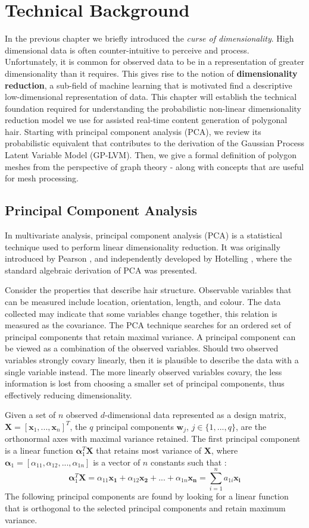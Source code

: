 \documentclass[ %
author={Dillon Keith Diep},
supervisor={Dr. Carl Henrik Ek},
degree={MEng},
title={ART-CG Hair:},
subtitle={Assisted Real-time Content Generation of Stylised Virtual Hair},
type={Research},
year={2017} ]{dissertation}
\begin{document}
\chapter{Technical Background}
\label{chap:technical}
In the previous chapter we briefly introduced the \textit{curse of dimensionality}. High dimensional data is often counter-intuitive to perceive and process. Unfortunately, it is common for observed data to be in a representation of greater dimensionality than it requires. This gives rise to the notion of \textbf{dimensionality reduction}, a sub-field of machine learning that is motivated find a descriptive low-dimensional representation of data.
This chapter will establish the technical foundation required for understanding the probabilistic non-linear dimensionality reduction model we use for assisted real-time content generation of polygonal hair. Starting with principal component analysis (PCA), we review its probabilistic equivalent that contributes to the derivation of the Gaussian Process Latent Variable Model (GP-LVM). Then, we give a formal definition of polygon meshes from the perspective of graph theory - along with concepts that are useful for mesh processing.

\section{Principal Component Analysis}
In multivariate analysis, principal component analysis (PCA) is a statistical technique used to perform linear dimensionality reduction. It was originally introduced by Pearson \cite{pca1901}, and independently developed by Hotelling \cite{pca1933}, where the standard algebraic derivation of PCA was presented.

Consider the properties that describe hair structure. Observable variables that can be measured include location, orientation, length, and colour. The data collected may indicate that some variables change together, this relation is measured as the covariance. The PCA technique searches for an ordered set of principal components that retain maximal variance. A principal component can be viewed as a combination of the observed variables. Should two observed variables strongly covary linearly, then it is plausible to describe the data with a single variable instead. The more linearly observed variables covary, the less information is lost from choosing a smaller set of principal components, thus effectively reducing dimensionality.

Given a set of $n$ observed $d$-dimensional data represented as a design matrix, $\bm{X}=[\bm{x}_1,...,\bm{x}_n]^T$, the $q$ principal components $\bm{w}_j$, $j \in \{1,...,q\}$, are the orthonormal axes with maximal variance retained. The first principal component is a linear function $\bm{\alpha}^T_1\bm{X}$ that retains most variance of $\bm{X}$, where $\bm{\alpha}_1 = [\alpha_{11}, \alpha_{12}, ..., \alpha_{1n}]$ is a vector of $n$ constants such that \cite[p.4]{pca2002}:
$$\bm{\alpha}^T_1\bm{X}=\alpha_{11}\bm{x_1}+\alpha_{12}\bm{x_2}+...+\alpha_{1n}\bm{x_n} = \sum^n_{i=1}a_{1i}\bm{x_i}$$
The following principal components are found by looking for a linear function that is orthogonal to the selected principal components and retain maximum variance.
\end{document}
